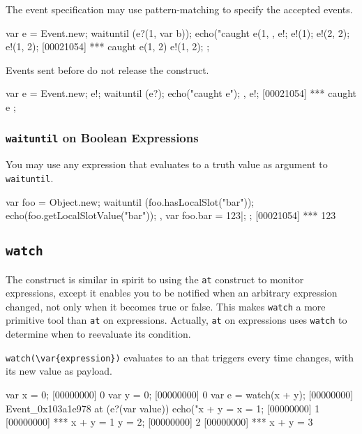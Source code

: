 The event specification may use pattern-matching to specify the
accepted events.

\begin{urbiscript}
{
  var e = Event.new;
  {
    waituntil (e?(1, var b));
    echo("caught e(1, %
  },
  e!;
  e!(1);
  e!(2, 2);
  e!(1, 2);
[00021054] *** caught e(1, 2)
  e!(1, 2);
};
\end{urbiscript}

Events sent before do not release the construct.

\begin{urbiscript}
{
  var e = Event.new;
  e!;
  {
    waituntil (e?);
    echo("caught e");
  },
  e!;
[00021054] *** caught e
};
\end{urbiscript}

\subsubsection{\lstinline{waituntil} on Boolean Expressions}

You may use any expression that evaluates to a truth value as argument
to \lstinline{waituntil}.

\begin{urbiscript}
{
  var foo = Object.new;
  {
    waituntil (foo.hasLocalSlot("bar"));
    echo(foo.getLocalSlotValue("bar"));
  },
  var foo.bar = 123|;
};
[00021054] *** 123
\end{urbiscript}

\subsection{\lstinline{watch}}
\label{sec:lang:watch}


The  construct is similar in spirit to using the
\lstinline{at} construct to monitor expressions, except it enables you to be
notified when an arbitrary expression changed, not only when it becomes true
or false. This makes \lstinline{watch} a more primitive tool than
\lstinline{at} on expressions.  Actually, \lstinline{at} on expressions uses
\lstinline{watch} to determine when to reevaluate its condition.

\lstinline|watch(\var{expression})| evaluates to an  that
triggers every time  changes, with its new value as payload.

\begin{urbiscript}[firstnumber=1]
var x = 0;
[00000000] 0
var y = 0;
[00000000] 0
var e = watch(x + y);
[00000000] Event_0x103a1e978
at (e?(var value))
  echo("x + y = %
x = 1;
[00000000] 1
[00000000] *** x + y = 1
y = 2;
[00000000] 2
[00000000] *** x + y = 3
\end{urbiscript}


